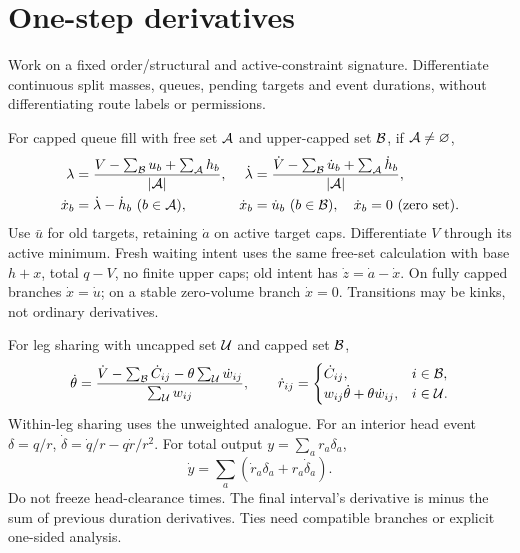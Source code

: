 \documentclass[10pt,a4paper]{article}
\begin{document}
\section{One-step derivatives}

Work on a fixed order/structural and active-constraint signature. Differentiate
continuous split masses, queues, pending targets and event durations, without
differentiating route labels or permissions.

For capped queue fill with free set $ {\cal A}$ and upper-capped set
$ {\cal B}$, if $ {\cal A}\ne\varnothing$,
\begin{align}
 \lambda&=\frac{V-\sum_{{\cal B}}u_b+\sum_{{\cal A}}h_b}{|{\cal A}|},
 &\dot\lambda&=\frac{\dot V-\sum_{{\cal B}}\dot u_b+
                       \sum_{{\cal A}}\dot h_b}{|{\cal A}|},\nonumber\\
 \dot x_b&=\dot\lambda-\dot h_b\ (b\in{\cal A}),&
 \dot x_b&=\dot u_b\ (b\in{\cal B}),\quad
 \dot x_b=0\ (\text{zero set}).
 \label{eq:allocation-jacobian-new}
\end{align}
Use $\bar u$ for old targets, retaining $\dot a$ on active target caps.
Differentiate $V$ through its active minimum. Fresh waiting intent uses
the same free-set calculation with base $h+x$, total $q-V$, no finite
upper caps; old intent has $\dot z=\dot a-\dot x$.
On fully capped branches $\dot x=\dot u$; on a stable zero-volume branch
$\dot x=0$. Transitions may be kinks, not ordinary derivatives.

For leg sharing with uncapped set $ {\cal U}$ and capped set $ {\cal B}$,
\begin{equation}
 \dot\theta=
 \frac{\dot V-\sum_{{\cal B}}\dot C_{ij}
                -\theta\sum_{{\cal U}}\dot w_{ij}}
      {\sum_{{\cal U}}w_{ij}},\qquad
 \dot r_{ij}=
 \begin{cases}\dot C_{ij},&i\in{\cal B},\\
 w_{ij}\dot\theta+\theta\dot w_{ij},&i\in{\cal U}.
 \end{cases}
 \label{eq:priority-jacobian-new}
\end{equation}
Within-leg sharing uses the unweighted analogue. For an interior head event
$\delta=q/r$, $\dot\delta=\dot q/r-q\dot r/r^2$.
For total output $y=\sum_a r_a\delta_a$,
\begin{equation}
 \dot y=\sum_a(\dot r_a\delta_a+r_a\dot\delta_a).
 \label{eq:service-jacobian-new}
\end{equation}
Do not freeze head-clearance times. The final interval's derivative is minus
the sum of previous duration derivatives. Ties need compatible branches or
explicit one-sided analysis.
\end{document}
